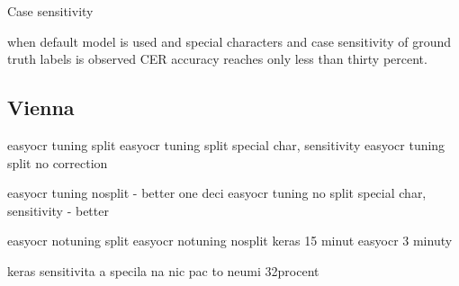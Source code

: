 








Case sensitivity


when default model is used and special characters and case sensitivity of ground truth labels is observed CER accuracy reaches only less than thirty percent. 


\subsection*{Vienna}

easyocr tuning split
easyocr tuning split special char, sensitivity
easyocr tuning split no correction

easyocr tuning nosplit - better one deci
easyocr tuning no split special char, sensitivity - better

easyocr notuning split
easyocr notuning nosplit 
keras 15 minut easyocr 3 minuty


keras sensitivita a specila na nic pac to neumi 32procent